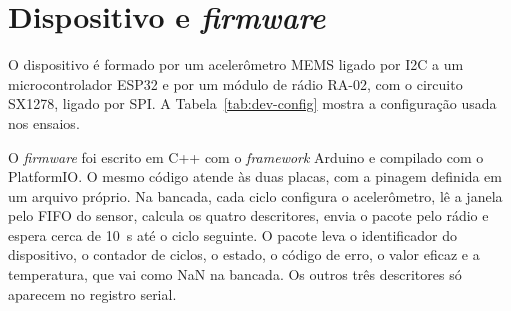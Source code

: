 \section{Dispositivo e \emph{firmware}}
\label{sec:dev-firmware}

O dispositivo é formado por um acelerômetro MEMS ligado por I2C a um microcontrolador ESP32
e por um módulo de rádio RA-02, com o circuito SX1278, ligado por SPI. A
Tabela~\ref{tab:dev-config} mostra a configuração usada nos ensaios. 

\begin{table}[!htb]
\end{table}

O \emph{firmware} foi escrito em C++ com o \emph{framework} Arduino e compilado com o
PlatformIO. O mesmo código atende às duas placas, com a pinagem definida em um arquivo
próprio. Na bancada, cada
ciclo configura o acelerômetro, lê a janela pelo FIFO do sensor, calcula os quatro descritores,
envia o pacote pelo rádio e espera cerca de \SI{10}{\second} até o ciclo seguinte. O pacote leva
o identificador do dispositivo, o contador de ciclos, o estado, o código de erro, o valor eficaz e a
temperatura, que vai como NaN na bancada. Os outros três descritores só aparecem no registro serial.

